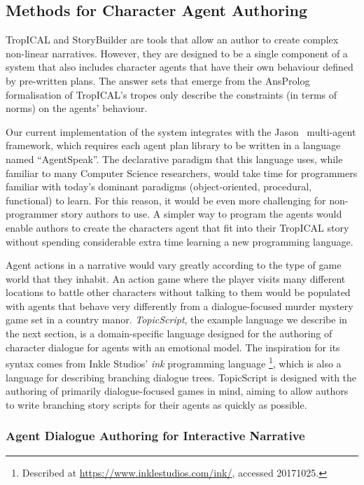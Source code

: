 \documentclass[11pt]{report}
\begin{document}
\subsection{Methods for Character Agent Authoring}
\label{sec:future-agent}
TropICAL and StoryBuilder are tools that allow an author to create complex
non-linear narratives. However, they are designed to be a single component of a
system that also includes character agents that have their own behaviour defined
by pre-written plans. The answer sets that emerge from the AnsProlog
formalisation of TropICAL's tropes only describe the constraints (in terms of
norms) on the agents' behaviour.

Our current implementation of the system integrates with the Jason~\citep{bordini2007programming} multi-agent
framework, which requires each agent plan library to be written in a language
named ``AgentSpeak''. The declarative paradigm that this language uses, while
familiar to many Computer Science researchers, would take time for programmers
familiar with today's dominant paradigms (object-oriented, procedural,
functional) to learn. For this reason, it would be even more challenging for
non-programmer story authors to use. A simpler way to program the agents would
enable authors to create the characters agent that fit into their TropICAL story
without spending considerable extra time learning a new programming language.

Agent actions in a narrative would vary greatly according to the type of game
world that they inhabit. An action game where the player visits many different
locations to battle other characters without talking to them would be populated
with agents that behave very differently from a dialogue-focused murder mystery
game set in a country manor. \emph{TopicScript}, the example language we
describe in the next section, is a domain-specific language designed for the
authoring of character dialogue for agents with an emotional model. The inspiration
for its syntax comes from Inkle Studios' \emph{ink} programming language
\footnote{Described at \url{https://www.inklestudios.com/ink/}, accessed 20171025.}, which is
also a language for describing branching dialogue trees. TopicScript is designed
with the authoring of primarily dialogue-focused games in mind, aiming to allow
authors to write branching story scripts for their agents as quickly as possible.

\subsubsection{Agent Dialogue Authoring for Interactive Narrative}
\label{sec:topicscript}
\end{document}
